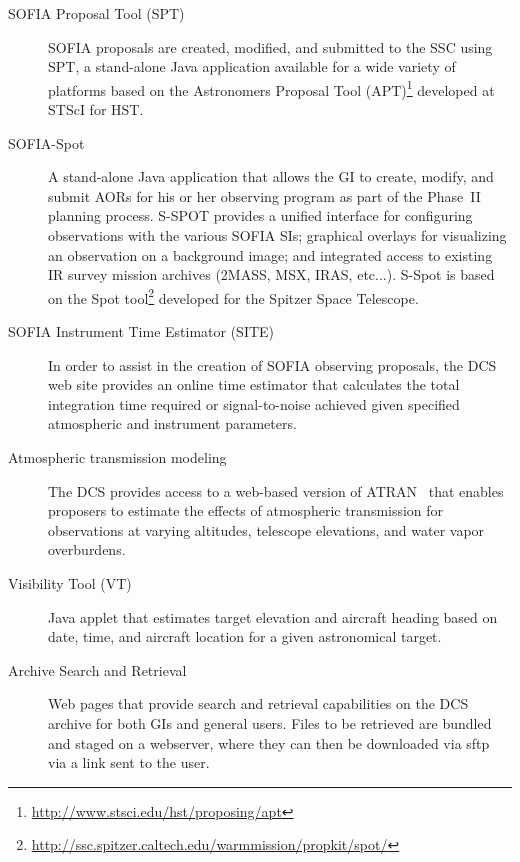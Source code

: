 \begin{description}

\item[SOFIA Proposal Tool (SPT)] SOFIA proposals are created, modified, and submitted to the SSC using SPT, a stand-alone Java application available for a wide variety of platforms based on the Astronomers Proposal Tool (APT)\footnote{
\url{http://www.stsci.edu/hst/proposing/apt}}
 developed at STScI for HST.


\item[SOFIA-Spot] A stand-alone Java application that allows the GI to create, modify, and submit AORs for his or her observing program as part of the Phase~II planning process. S-SPOT provides a unified interface for configuring observations with the various SOFIA SIs; graphical overlays for visualizing an observation on a background image; and integrated access to existing IR survey mission archives (2MASS, MSX, IRAS, etc...).  S-Spot is based on the Spot tool\footnote{
\url{http://ssc.spitzer.caltech.edu/warmmission/propkit/spot/}}
developed for the Spitzer Space Telescope.

\item[SOFIA Instrument Time Estimator (SITE)] In order to assist in the creation of SOFIA observing proposals, the DCS web site provides an online time estimator that calculates the total integration time required or signal-to-noise achieved given specified atmospheric and instrument parameters. 

\item[Atmospheric transmission modeling] The DCS provides access to a web-based version of ATRAN~\citep{Lord:1992} that enables proposers to estimate the effects of atmospheric transmission for observations at varying altitudes, telescope elevations,  and water vapor overburdens.  

\item[Visibility Tool (VT)] Java applet that estimates target elevation and aircraft heading based on date, time, and aircraft location for a given astronomical target.  

\item[Archive Search and Retrieval] Web pages that provide search and retrieval capabilities on the DCS archive for both GIs and general users.  Files to be retrieved are bundled and staged on a webserver, where they can then be downloaded via sftp via a link sent to the user.

\end{description}

